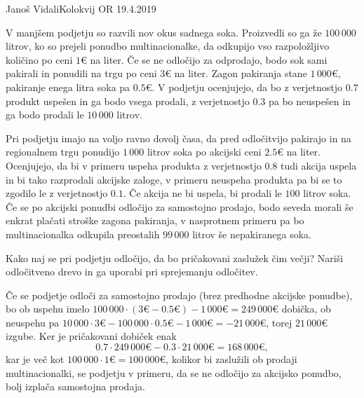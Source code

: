\begin{naloga}{Janoš Vidali}{Kolokvij OR 19.4.2019}
\begin{vprasanje}
V manjšem podjetju so razvili nov okus sadnega soka.
Proizvedli so ga že $100\,000$ litrov,
ko so prejeli ponudbo multinacionalke,
da odkupijo vso razpoložljivo količino po ceni $1 €$ na liter.
Če se ne odločijo za odprodajo,
bodo sok sami pakirali in ponudili na trgu po ceni $3 €$ na liter.
Zagon pakiranja stane $1\,000 €$, pakiranje enega litra soka pa $0.5 €$.
V podjetju ocenjujejo,
da bo z verjetnostjo $0.7$ produkt uspešen in ga bodo vsega prodali,
z verjetnostjo $0.3$ pa bo neuspešen in ga bodo prodali le $10\,000$ litrov.

Pri podjetju imajo na voljo ravno dovolj časa,
da pred odločitvijo pakirajo in na regionalnem trgu
ponudijo $1\,000$ litrov soka po akcijski ceni $2.5 €$ na liter.
Ocenjujejo,
da bi v primeru uspeha produkta z verjetnostjo $0.8$ tudi akcija uspela
in bi tako razprodali akcijske zaloge,
v primeru neuspeha produkta pa bi se to zgodilo le z verjetnostjo $0.1$.
Če akcija ne bi uspela, bi prodali le $100$ litrov soka.
Če se po akcijski ponudbi odločijo za samostojno prodajo,
bodo seveda morali še enkrat plačati stroške zagona pakiranja,
v nasprotnem primeru pa bo multinacionalka
odkupila preostalih $99\,000$ litrov še nepakiranega soka.

\smallskip

Kako naj se pri podjetju odločijo, da bo pričakovani zaslužek čim večji?
Nariši od\-lo\-čit\-ve\-no drevo in ga uporabi pri sprejemanju odločitev.
\end{vprasanje}

\begin{odgovor}
Če se podjetje odloči za samostojno prodajo (brez predhodne akcijske ponudbe),
bo ob uspehu imelo
$100\,000 \cdot (3 € - 0.5 €) - 1\,000 € = 249\,000 €$ dobička,
ob ne\-uspe\-hu pa
$10\,000 \cdot 3 € - 100\,000 \cdot 0.5 € - 1\,000 € = -21\,000 €$,
torej $21\,000 €$ izgube.
Ker je pričakovani dobiček enak
$$
0.7 \cdot 249\,000 € - 0.3 \cdot 21\,000 € = 168\,000 €,
$$
kar je več kot $100\,000 \cdot 1 € = 100\,000 €$,
kolikor bi zaslužili ob prodaji multinacionalki,
se podjetju v primeru, da se ne odločijo za akcijsko ponudbo,
bolj izplača samostojna prodaja.


\end{odgovor}
\end{naloga}
